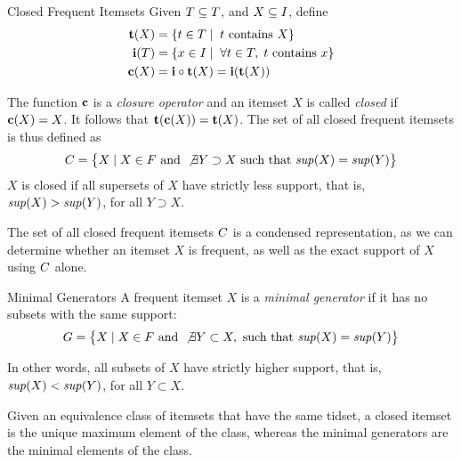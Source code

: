 \begin{frame}{Closed Frequent Itemsets}
  \small
Given $T \subseteq {\relax T}$, and $X
\subseteq {\relax I}$, define
\begin{align*}
  {\mathbf{t}}(X) & = \{ t \in {\relax T} \mid\; t \text{ contains } X\}\\
  {\mathbf{i}}(T) & = \{ x \in {\relax I} \mid\; \forall t\in T, \;t \mbox{ contains } x
  \}\\
   {\mathbf{c}}(X) & =  {\mathbf{i}} \circ {\mathbf{t}} (X) = {\mathbf{i}} ( {\mathbf{t}} (X))
\end{align*}

\medskip
The function ${\mathbf{c}}$ is a {\em closure operator} 
and an itemset $X$ is called {\em closed} if ${\mathbf{c}}(X) = X$.
It follows that ${\mathbf{t}}({\mathbf{c}}(X))={\mathbf{t}}(X)$. The
set of all closed frequent itemsets is thus def\/{i}ned as
\begin{align*}
{\relax C} = \bigl\{X \mid X \in  {\relax F} \text{ and } \not\exists Y \supset X
\text{  such that } \mathit{sup}(X) = \mathit{sup}(Y)\bigr\}
\end{align*}
$X$ is closed if all supersets of $X$ have strictly less
support, that is, $\mathit{sup}(X) > \mathit{sup}(Y)$, for all $Y \supset X$.

\medskip
The set of all closed frequent itemsets ${\relax C}$ is a condensed
representation, as we can determine whether an itemset $X$ is
frequent, as well as the exact support of $X$ using ${\relax C}$ alone.
\end{frame}


\begin{frame}{Minimal Generators}
A frequent itemset $X$ is a {\em minimal generator} if
it has no subsets with the same support:
\begin{align*}
{\relax G} = \bigl\{X \mid X \in  {\relax F} \text{ and } \not\exists Y \subset X,
\text{ such that } \mathit{sup}(X) = \mathit{sup}(Y)\bigr\}
\end{align*}

  \medskip
In other words, all subsets of $X$
have strictly higher support, that is,
  $\mathit{sup}(X) < \mathit{sup}(Y)$, for all $Y \subset X$.

  \medskip
Given an equivalence class of itemsets that have the
same tidset, a closed itemset is the unique maximum element of the class,
whereas the minimal generators are the minimal elements of the class.
\end{frame}


